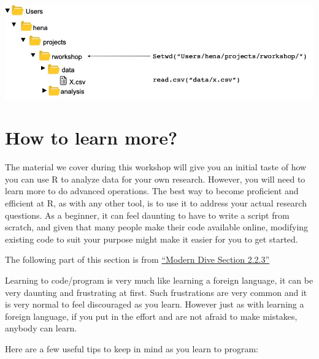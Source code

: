\documentclass[
]{book}
\begin{document}
\includegraphics{filepath.jpg}

\hypertarget{how-to-learn-more}{%
\section{How to learn more?}\label{how-to-learn-more}}

The material we cover during this workshop will give you an initial taste of how you can use R to analyze data for your own research. However, you will need to learn more to do advanced operations. The best way to become proficient and efficient at R, as with any other tool, is to use it to address your actual research questions. As a beginner, it can feel daunting to have to write a script from scratch, and given that many people make their code available online, modifying existing code to suit your purpose might make it easier for you to get started.

The following part of this section is from \href{\%22https://moderndive.com/2-getting-started.html\%22}{``Modern Dive Section 2.2.3''}

Learning to code/program is very much like learning a foreign language, it can be very daunting and frustrating at first. Such frustrations are very common and it is very normal to feel discouraged as you learn. However just as with learning a foreign language, if you put in the effort and are not afraid to make mistakes, anybody can learn.

Here are a few useful tips to keep in mind as you learn to program:
\end{document}
